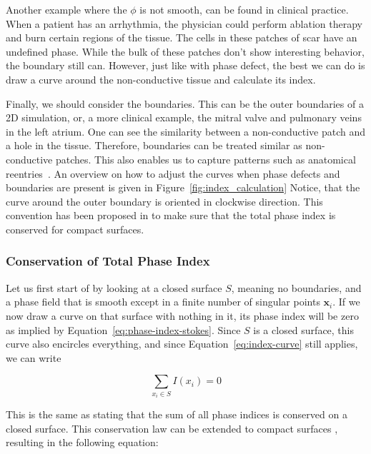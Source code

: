 \documentclass[twocolumn]{article}
\begin{document}
Another example where the $\phi$ is not smooth,
can be found in clinical practice.
When a patient has an arrhythmia,
the physician could perform ablation therapy
and burn  certain regions of the tissue.
The cells in these patches of scar have an undefined phase.
While the bulk of these patches don't show interesting behavior,
the boundary still can.
However, just like with phase defect,
the best we can do is draw a curve around the non-conductive tissue
and calculate its index.

Finally, we should consider the boundaries.
This can be the outer boundaries of a 2D simulation,
or, a more clinical example, the mitral valve and pulmonary veins in the left atrium.
One can see the similarity between a non-conductive patch
and a hole in the tissue.
Therefore, boundaries can be treated similar as non-conductive patches.
This also enables us to capture patterns such as anatomical reentries~\autocite{duytschaever2024atrial}.
An overview on how to adjust the curves when phase defects and boundaries are present
is given in Figure~\ref{fig:index_calculation}
Notice, that the curve around the outer boundary is oriented in clockwise direction.
This convention has been proposed in \textcite{davidsen2004topological} to make sure
that the total phase index is conserved for compact surfaces.

\subsubsection{Conservation of Total Phase Index}

Let us first start of by looking at a closed surface $S$, meaning no boundaries,
and a phase field that is smooth except in a finite number of singular points $\bm{x}_i$.
If we now draw a curve on that surface with nothing in it,
its phase index will be zero as implied by Equation~\ref{eq:phase-index-stokes}.
Since \(S\) is a closed surface, this curve also encircles everything,
and since Equation~\ref{eq:index-curve} still applies,
we can write

\begin{equation}
  \sum_{x_i \in S} I(x_i) = 0
  \label{eq:index-theorem}
\end{equation}

\noindent This is the same as stating that the sum of all phase indices is
conserved on a closed surface.
This conservation law can be extended to compact surfaces \autocite{herlin2012reconstruction, davidsen2004topological},
resulting in the following equation:
\end{document}
